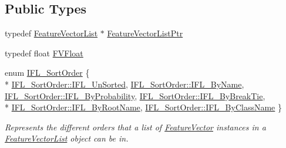 \subsection*{Public Types}
\begin{DoxyCompactItemize}
\item 
typedef \hyperlink{class_k_k_m_l_l_1_1_feature_vector_list}{Feature\+Vector\+List} $\ast$ \hyperlink{class_k_k_m_l_l_1_1_feature_vector_list_af22f34b214e0dd3b16760002ce392355}{Feature\+Vector\+List\+Ptr}
\item 
typedef float \hyperlink{class_k_k_m_l_l_1_1_feature_vector_list_a91983a1c7d8e4a92a39ef7494909f75b}{F\+V\+Float}
\item 
enum \hyperlink{class_k_k_m_l_l_1_1_feature_vector_list_a24e87fc6e8ca10537dbcd275bb339a3c}{I\+F\+L\+\_\+\+Sort\+Order} \{ \\*
\hyperlink{class_k_k_m_l_l_1_1_feature_vector_list_a24e87fc6e8ca10537dbcd275bb339a3ca0e3e88ff557d4664b67de1a03649c67a}{I\+F\+L\+\_\+\+Sort\+Order\+::\+I\+F\+L\+\_\+\+Un\+Sorted}, 
\hyperlink{class_k_k_m_l_l_1_1_feature_vector_list_a24e87fc6e8ca10537dbcd275bb339a3ca2f4f99044472e3cbd543b41112759f35}{I\+F\+L\+\_\+\+Sort\+Order\+::\+I\+F\+L\+\_\+\+By\+Name}, 
\hyperlink{class_k_k_m_l_l_1_1_feature_vector_list_a24e87fc6e8ca10537dbcd275bb339a3ca0c87b63f44334602ea2f76d4e9eb94ac}{I\+F\+L\+\_\+\+Sort\+Order\+::\+I\+F\+L\+\_\+\+By\+Probability}, 
\hyperlink{class_k_k_m_l_l_1_1_feature_vector_list_a24e87fc6e8ca10537dbcd275bb339a3ca10157ce8ae055470f440fbbfdfd0cee8}{I\+F\+L\+\_\+\+Sort\+Order\+::\+I\+F\+L\+\_\+\+By\+Break\+Tie}, 
\\*
\hyperlink{class_k_k_m_l_l_1_1_feature_vector_list_a24e87fc6e8ca10537dbcd275bb339a3ca8762df3d5f76e835cf43ca2047fd1da9}{I\+F\+L\+\_\+\+Sort\+Order\+::\+I\+F\+L\+\_\+\+By\+Root\+Name}, 
\hyperlink{class_k_k_m_l_l_1_1_feature_vector_list_a24e87fc6e8ca10537dbcd275bb339a3caebe3a5e287896587aeaac8ef3c311f9e}{I\+F\+L\+\_\+\+Sort\+Order\+::\+I\+F\+L\+\_\+\+By\+Class\+Name}
 \}\begin{DoxyCompactList}\small\item\em Represents the different orders that a list of \hyperlink{class_k_k_m_l_l_1_1_feature_vector}{Feature\+Vector} instances in a \hyperlink{class_k_k_m_l_l_1_1_feature_vector_list}{Feature\+Vector\+List} object can be in. \end{DoxyCompactList}
\end{DoxyCompactItemize}
